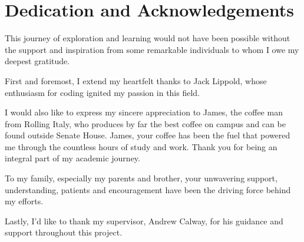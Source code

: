 \chapter*{Dedication and Acknowledgements}
\begin{SingleSpace}
This journey of exploration and learning would not have been possible without the support and inspiration from some remarkable individuals to whom I owe my deepest gratitude.

First and foremost, I extend my heartfelt thanks to Jack Lippold, whose enthusiasm for coding ignited my passion in this field. 

I would also like to express my sincere appreciation to James, the coffee man from Rolling Italy, who produces by far the best coffee on campus and can be found outside Senate House. James, your coffee has been the fuel that powered me through the countless hours of study and work. Thank you for being an integral part of my academic journey.

To my family, especially my parents and brother, your unwavering support, understanding, patients and encouragement have been the driving force behind my efforts.

Lastly, I'd like to thank my supervisor, Andrew Calway, for his guidance and support throughout this project.
\newline    


\end{SingleSpace}
\clearpage
